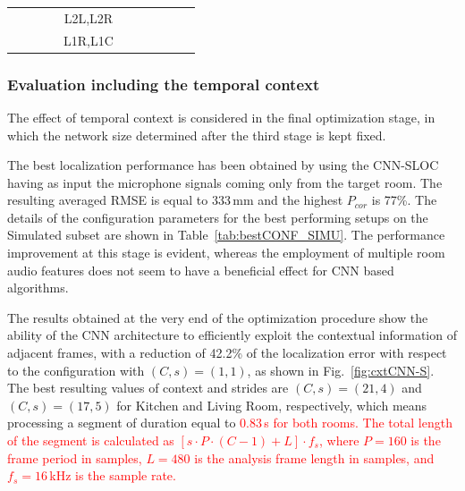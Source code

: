 \documentclass[review]{elsarticle}
\newcommand{\figref}[1]{Fig.~\ref{#1}}
\newcommand{\tableref}[1]{Table~\ref{#1}}
\begin{document}
\begin{table}[!h]
{\begin{tabular}{c|cc|cc|cc|cc|cc}
		&                                &                          &                                                                            & L2L,L2R               &                                         &                                             &                      &                      &                      &                     \\
		&                                &                          &                                                                            & L1R,L1C               &                                         &                                             &                      &                      &                      &                     \\
	\end{tabular}
	}
\end{table}



\subsubsection{Evaluation including the temporal context}
The effect of temporal context is considered in the final optimization stage, in which the network size determined after the third stage is kept fixed. %

The best localization performance has been obtained by using the CNN-SLOC having as input the microphone signals coming only from the target room. The resulting averaged RMSE is equal to 333\,mm and the highest $P_{cor}$ is 77\%. The details of the configuration parameters for the best performing setups on the Simulated subset are shown in \tableref{tab:bestCONF_SIMU}. The performance improvement at this stage is evident, whereas the employment of multiple room audio features does not seem to have a beneficial effect for CNN based algorithms. 

The results obtained at the very end of the optimization procedure show the ability of the CNN architecture to efficiently exploit the contextual information of adjacent frames, with a reduction of 42.2\% of the localization error with respect to the configuration with $(C,s)=(1,1)$, as shown in \figref{fig:cxtCNN-S}. 
The best resulting values of context and strides are $(C,s)=(21,4)$ and $(C,s)=(17,5)$ for Kitchen and Living Room, respectively, which means processing a segment of duration equal to \textcolor{red}{0.83\,s for both rooms. The total length of the segment is calculated as $\left [s\cdot P \cdot(C-1)+L \right ]\cdot f_s$, where $P=160$ is the frame period in samples,  $L=480$ is the analysis frame length in samples, and $f_s=16$\,kHz is the sample rate.} 
\end{document}
